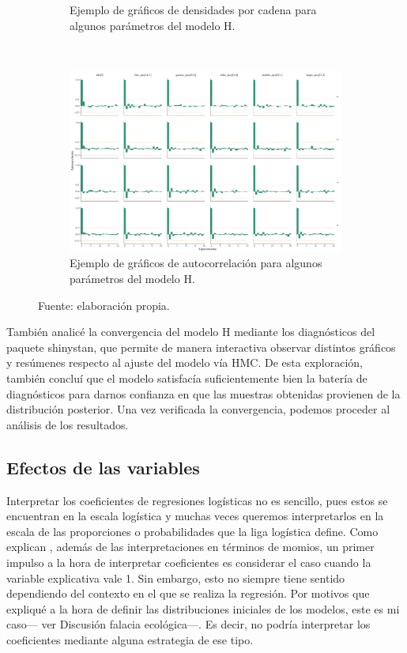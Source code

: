\begin{figure}[h]
\begin{subfigure}{0.45\textwidth}
	\caption{Ejemplo de gráficos de densidades por cadena para algunos parámetros del modelo H.}
	\label{fig:Densidades_H}
	\end{subfigure}
	~
	\begin{subfigure}{0.6\textwidth}
	\includegraphics[width = \textwidth]{Figs/Convergencia/Convergencia_AutoCorr}
	\caption{Ejemplo de gráficos de autocorrelación para algunos parámetros del modelo H.}
	\label{fig:Autocorr_H}
	\end{subfigure}
	\caption{Fuente: elaboración propia.}
\end{figure}

 También analicé la convergencia del modelo H mediante los diagnósticos del paquete shinystan, que permite de manera interactiva observar distintos gráficos y resúmenes respecto al ajuste del modelo vía HMC. De esta exploración, también concluí que el modelo satisfacía suficientemente bien la batería de diagnósticos para darnos confianza en que las muestras obtenidas provienen de la distribución posterior. Una vez verificada la convergencia, podemos proceder al análisis de los resultados. 
 
\subsection*{Efectos de las variables}

Interpretar los coeficientes de regresiones logísticas no es sencillo, pues estos se encuentran en la escala logística y muchas veces queremos interpretarlos en la escala de las proporciones o probabilidades que la liga logística define. Como explican \textcite{GelmanHill06}, además de las interpretaciones en términos de momios, un primer impulso a la hora de interpretar coeficientes es considerar el caso cuando la variable explicativa vale 1. Sin embargo, esto no siempre tiene sentido dependiendo del contexto en el que se realiza la regresión. Por motivos que expliqué a la hora de definir las distribuciones iniciales de los modelos, este es mi caso--- ver {\color{Red} Discusión falacia ecológica}---. Es decir, no podría interpretar los coeficientes mediante alguna estrategia de ese tipo.\\ 

